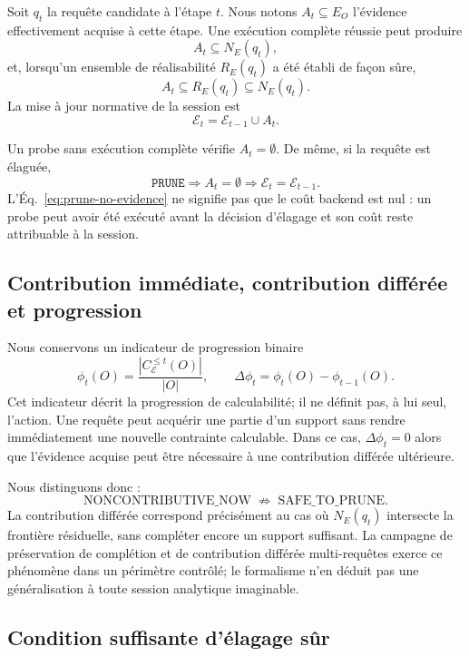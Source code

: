 \documentclass[journal]{IEEEtran}
\begin{document}
Soit $q_t$ la requête candidate à l'étape $t$. Nous notons $A_t\subseteq E_O$ l'évidence effectivement acquise à cette étape. Une exécution complète réussie peut produire
\[
A_t\subseteq N_E(q_t),
\]
et, lorsqu'un ensemble de réalisabilité $R_E(q_t)$ a été établi de façon sûre,
\[
A_t\subseteq R_E(q_t)\subseteq N_E(q_t).
\]
La mise à jour normative de la session est
\begin{equation}
\label{eq:evidence-update}
\mathcal{E}_t=\mathcal{E}_{t-1}\cup A_t.
\end{equation}

Un probe sans exécution complète vérifie $A_t=\emptyset$. De même, si la requête est élaguée,
\begin{equation}
\label{eq:prune-no-evidence}
\texttt{PRUNE}
\Longrightarrow
A_t=\emptyset
\Longrightarrow
\mathcal{E}_t=\mathcal{E}_{t-1}.
\end{equation}
L'Éq.~\eqref{eq:prune-no-evidence} ne signifie pas que le coût backend est nul : un probe peut avoir été exécuté avant la décision d'élagage et son coût reste attribuable à la session.

\subsection{Contribution immédiate, contribution différée et progression}

Nous conservons un indicateur de progression binaire
\[
\phi_t(O)
=
\frac{|C_{\mathcal{E}}^{\le t}(O)|}{|O|},
\qquad
\Delta\phi_t
=
\phi_t(O)-\phi_{t-1}(O).
\]
Cet indicateur décrit la progression de calculabilité; il ne définit pas, à lui seul, l'action. Une requête peut acquérir une partie d'un support sans rendre immédiatement une nouvelle contrainte calculable. Dans ce cas, $\Delta\phi_t=0$ alors que l'évidence acquise peut être nécessaire à une contribution différée ultérieure.

Nous distinguons donc :
\[
\text{NONCONTRIBUTIVE\_NOW}
\;\not\Rightarrow\;
\text{SAFE\_TO\_PRUNE}.
\]
La contribution différée correspond précisément au cas où $N_E(q_t)$ intersecte la frontière résiduelle, sans compléter encore un support suffisant. La campagne de préservation de complétion et de contribution différée multi-requêtes exerce ce phénomène dans un périmètre contrôlé; le formalisme n'en déduit pas une généralisation à toute session analytique imaginable.

\subsection{Condition suffisante d'élagage sûr}
\end{document}
